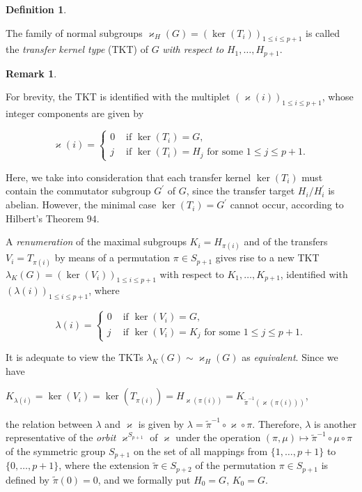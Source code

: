 \documentclass{amsart}
\theoremstyle{definition}
\newtheorem{definition}{Definition}[section]
\newtheorem{remark}{Remark}[section]
\numberwithin{equation}{section}
\begin{document}
\begin{definition}
\label{dfn:DrvQtnTypePePe}

The family of normal subgroups \(\varkappa_H(G)=(\ker(T_i))_{1\le i\le p+1}\) is called
the \textit{transfer kernel type} (TKT) of \(G\) \textit{with respect to} \(H_1,\ldots,H_{p+1}\).

\end{definition}


\begin{remark}
\label{rmk:OrbitTypePePe}

For brevity, the TKT is identified with the multiplet \((\varkappa(i))_{1\le i\le p+1}\),
whose integer components are given by

\begin{equation}
\label{eqn:TKTPxP}
\varkappa(i)=
\begin{cases}
0 & \text{ if } \ker(T_i)=G,\\
j & \text{ if } \ker(T_i)=H_j \text{ for some } 1\le j\le p+1.
\end{cases}
\end{equation}

\noindent
Here, we take into consideration that each transfer kernel \(\ker(T_i)\)
must contain the commutator subgroup \(G^\prime\) of \(G\),
since the transfer target \(H_i/H_i^\prime\) is abelian.
However, the minimal case \(\ker(T_i)=G^\prime\) cannot occur,
according to Hilbert's Theorem \(94\).

A \textit{renumeration} of the maximal subgroups \(K_i=H_{\pi(i)}\)
and of the transfers \(V_i=T_{\pi(i)}\) by means of a permutation \(\pi\in S_{p+1}\)
gives rise to a new TKT \(\lambda_K(G)=(\ker(V_i))_{1\le i\le p+1}\) with respect to \(K_1,\ldots,K_{p+1}\), identified with \((\lambda(i))_{1\le i\le p+1}\), where

\[\lambda(i)=
\begin{cases}
0 & \text{ if } \ker(V_i)=G,\\
j & \text{ if } \ker(V_i)=K_j \text{ for some } 1\le j\le p+1.
\end{cases}\]

\noindent
It is adequate to view the TKTs \(\lambda_K(G)\sim\varkappa_H(G)\) as \textit{equivalent}. 
Since we have

\begin{center}
\(K_{\lambda(i)}=\ker(V_i)=\ker(T_{\pi(i)})=H_{\varkappa(\pi(i))}=K_{\tilde{\pi}^{-1}(\varkappa(\pi(i)))}\),
\end{center}

\noindent
the relation between \(\lambda\) and \(\varkappa\) is given by
\(\lambda=\tilde{\pi}^{-1}\circ\varkappa\circ\pi\).
Therefore,
\(\lambda\) is another representative of the \textit{orbit} \(\varkappa^{S_{p+1}}\) of \(\varkappa\)
under the operation \((\pi,\mu)\mapsto\tilde{\pi}^{-1}\circ\mu\circ\pi\) of the symmetric group \(S_{p+1}\)
on the set of all mappings from \(\lbrace 1,\ldots,p+1\rbrace\) to \(\lbrace 0,\ldots,p+1\rbrace\),
where the extension \(\tilde{\pi}\in S_{p+2}\) of the permutation \(\pi\in S_{p+1}\)
is defined by \(\tilde{\pi}(0)=0\),
and we formally put \(H_0=G\), \(K_0=G\).

\end{remark}
\end{document}
